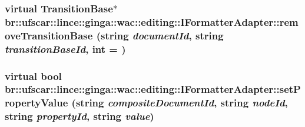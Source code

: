 \label{classbr_1_1ufscar_1_1lince_1_1ginga_1_1wac_1_1editing_1_1IFormatterAdapter_adc780d90fe7d64924f7e04aaf81c3462}
\hypertarget{classbr_1_1ufscar_1_1lince_1_1ginga_1_1wac_1_1editing_1_1IFormatterAdapter_aaea7ab5bcc692f8cfdd807a8caf2eca7}{
\subsubsection[{removeTransitionBase}]{\setlength{\rightskip}{0pt plus 5cm}virtual TransitionBase$\ast$ br::ufscar::lince::ginga::wac::editing::IFormatterAdapter::removeTransitionBase (string {\em documentId}, \/  string {\em transitionBaseId}, \/  int = {})}}
\label{classbr_1_1ufscar_1_1lince_1_1ginga_1_1wac_1_1editing_1_1IFormatterAdapter_aaea7ab5bcc692f8cfdd807a8caf2eca7}
\hypertarget{classbr_1_1ufscar_1_1lince_1_1ginga_1_1wac_1_1editing_1_1IFormatterAdapter_ad7074b5bc22a8efe7a8d7a20fdb8231e}{
\subsubsection[{setPropertyValue}]{\setlength{\rightskip}{0pt plus 5cm}virtual bool br::ufscar::lince::ginga::wac::editing::IFormatterAdapter::setPropertyValue (string {\em compositeDocumentId}, \/  string {\em nodeId}, \/  string {\em propertyId}, \/  string {\em value})}}
\label{classbr_1_1ufscar_1_1lince_1_1ginga_1_1wac_1_1editing_1_1IFormatterAdapter_ad7074b5bc22a8efe7a8d7a20fdb8231e}



